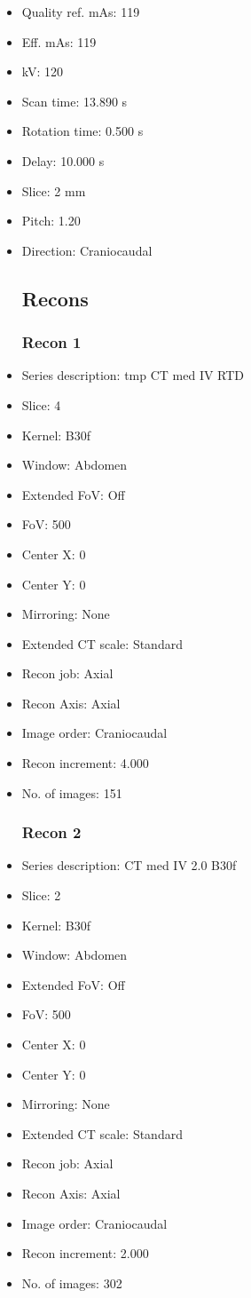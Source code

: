 \documentclass[12pt]{article}
\begin{document}
\begin{itemize}
\subsection{Scan}
\item Quality ref. mAs: 119\item Eff. mAs: 119\item kV: 120\item Scan time: 13.890 s\item Rotation time: 0.500 s\item Delay: 10.000 s\item Slice: 2 mm\item Pitch: 1.20\item Direction: Craniocaudal\subsection{Recons}

\subsubsection{Recon 1}
\item Series description: tmp CT med IV RTD
\item Slice: 4
\item Kernel: B30f
\item Window: Abdomen
\item Extended FoV: Off
\item FoV: 500
\item Center X: 0
\item Center Y: 0
\item Mirroring: None
\item Extended CT scale: Standard
\item Recon job: Axial
\item Recon Axis: Axial
\item Image order: Craniocaudal
\item Recon increment: 4.000
\item No. of images: 151
\subsubsection{Recon 2}
\item Series description: CT med IV  2.0  B30f
\item Slice: 2
\item Kernel: B30f
\item Window: Abdomen
\item Extended FoV: Off
\item FoV: 500
\item Center X: 0
\item Center Y: 0
\item Mirroring: None
\item Extended CT scale: Standard
\item Recon job: Axial
\item Recon Axis: Axial
\item Image order: Craniocaudal
\item Recon increment: 2.000
\item No. of images: 302

\end{itemize}
\end{document}
